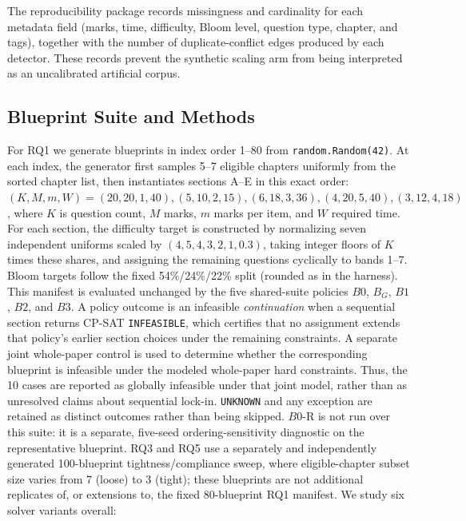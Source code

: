 \documentclass[runningheads]{llncs}
\begin{document}
\noindent The reproducibility package records missingness and cardinality for each metadata field (marks, time, difficulty, Bloom level, question type, chapter, and tags), together with the number of duplicate-conflict edges produced by each detector. These records prevent the synthetic scaling arm from being interpreted as an uncalibrated artificial corpus.

\subsection{Blueprint Suite and Methods}
\label{sec:methods}
For RQ1 we generate blueprints in index order 1--80 from \texttt{random.Random(42)}.
At each index, the generator first samples 5--7 eligible chapters uniformly from the sorted chapter list, then instantiates sections A--E in this exact order: $(K,M,m,W)=(20,20,1,40),(5,10,2,15),(6,18,3,36),(4,20,5,40),(3,12,4,18)$, where $K$ is question count, $M$ marks, $m$ marks per item, and $W$ required time.
For each section, the difficulty target is constructed by normalizing seven independent uniforms scaled by $(4,5,4,3,2,1,0.3)$, taking integer floors of $K$ times these shares, and assigning the remaining questions cyclically to bands 1--7.
Bloom targets follow the fixed 54\%/24\%/22\% split (rounded as in the harness).
This manifest is evaluated unchanged by the five shared-suite policies $B0$, $B_G$, $B1$, $B2$, and $B3$.
A policy outcome is an infeasible \emph{continuation} when a sequential section returns CP-SAT \texttt{INFEASIBLE}, which certifies that no assignment extends that policy's earlier section choices under the remaining constraints. A separate joint whole-paper control is used to determine whether the corresponding blueprint is infeasible under the modeled whole-paper hard constraints. Thus, the 10 cases are reported as globally infeasible under that joint model, rather than as unresolved claims about sequential lock-in.
\texttt{UNKNOWN} and any exception are retained as distinct outcomes rather than being skipped.
$B0$-R is not run over this suite: it is a separate, five-seed ordering-sensitivity diagnostic on the representative blueprint.
RQ3 and RQ5 use a separately and independently generated 100-blueprint tightness/compliance sweep, where eligible-chapter subset size varies from 7 (loose) to 3 (tight); these blueprints are not additional replicates of, or extensions to, the fixed 80-blueprint RQ1 manifest.
We study six solver variants overall:
\end{document}
